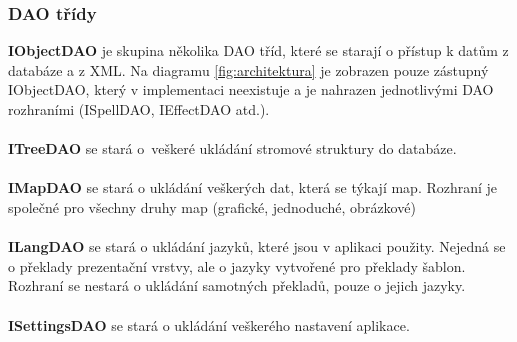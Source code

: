 \documentclass[thesis=B,czech]{resources/FITthesis}[2012/06/26]
\begin{document}
\subsubsection*{DAO třídy}
\noindent\textbf{IObjectDAO} je skupina několika DAO tříd, které se starají o přístup k datům z databáze a z XML. Na diagramu \ref{fig:architektura} je zobrazen pouze zástupný IObjectDAO, který v implementaci neexistuje a je nahrazen jednotlivými DAO rozhraními (ISpellDAO, IEffectDAO atd.).\\
\\
\textbf{ITreeDAO} se stará o~veškeré ukládání stromové struktury do databáze. \\
\\
\textbf{IMapDAO} se stará o ukládání veškerých dat, která se týkají map. Rozhraní je společné pro všechny druhy map (grafické, jednoduché, obrázkové)\\
\\
\textbf{ILangDAO} se stará o ukládání jazyků, které jsou v aplikaci použity. Nejedná se o překlady prezentační vrstvy, ale o jazyky vytvořené pro překlady šablon. Rozhraní se nestará o ukládání samotných překladů, pouze o jejich jazyky.\\
\\
\textbf{ISettingsDAO} se stará o ukládání veškerého nastavení aplikace. 
\end{document}
